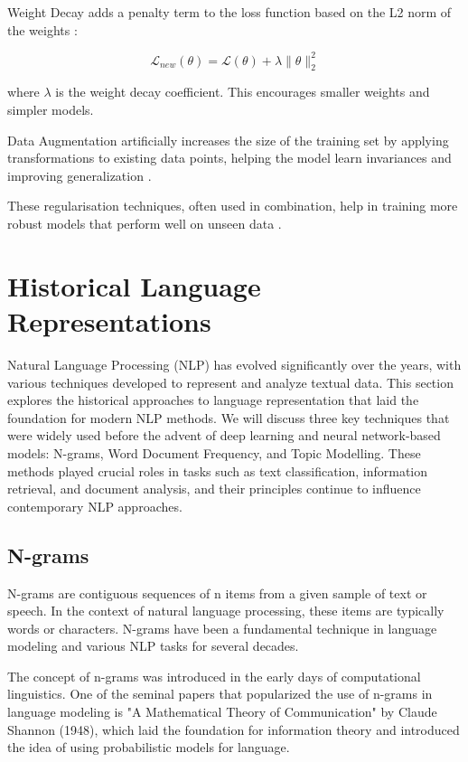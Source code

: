 \documentclass[a4paper, oneside]{discothesis}
\begin{document}
Weight Decay adds a penalty term to the loss function based on the L2 norm of the weights \cite{krogh1992simple}:

\begin{equation}
    \mathcal{L}_{new}(\theta) = \mathcal{L}(\theta) + \lambda \|\theta\|_2^2
\end{equation}

where $\lambda$ is the weight decay coefficient. This encourages smaller weights and simpler models.

Data Augmentation artificially increases the size of the training set by applying transformations to existing data points, helping the model learn invariances and improving generalization \cite{shorten2019survey}.

These regularisation techniques, often used in combination, help in training more robust models that perform well on unseen data \cite{kukavcka2017regularization}.

\section{Historical Language Representations}

Natural Language Processing (NLP) has evolved significantly over the years, with various techniques developed to represent and analyze textual data. This section explores the historical approaches to language representation that laid the foundation for modern NLP methods. We will discuss three key techniques that were widely used before the advent of deep learning and neural network-based models: N-grams, Word Document Frequency, and Topic Modelling. These methods played crucial roles in tasks such as text classification, information retrieval, and document analysis, and their principles continue to influence contemporary NLP approaches.

\subsection{N-grams}
N-grams are contiguous sequences of n items from a given sample of text or speech. In the context of natural language processing, these items are typically words or characters. N-grams have been a fundamental technique in language modeling and various NLP tasks for several decades.

The concept of n-grams was introduced in the early days of computational linguistics. One of the seminal papers that popularized the use of n-grams in language modeling is "A Mathematical Theory of Communication" by Claude Shannon (1948), which laid the foundation for information theory and introduced the idea of using probabilistic models for language.
\end{document}
